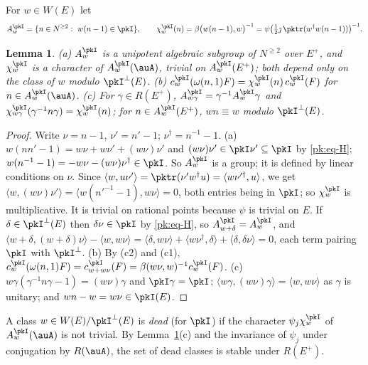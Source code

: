 \documentclass[10pt]{amsart}
\newtheorem{lemma}[theorem]{Lemma}
\theoremstyle{definition}
\theoremstyle{remark}
\begin{document}
For $w\in W(E)$ let
\[
A^{\pkI}_w=\{n\in N^{\ge2}:\ w(n-1)\in\pkI\},\qquad\chi^{\pkI}_w(n)=\beta\bigl(w(n-1),w\bigr)^{-1}=
\psi\bigl(\tfrac12\jmath\,\pktr(w^\dagger w(n-1))\bigr)^{-1}.
\]

\begin{lemma}\label{pk:char}
{\rm(a)} $A^{\pkI}_w$ is a unipotent algebraic subgroup of $N^{\ge2}$ over $E^+$, and
$\chi^{\pkI}_w$ is a character of $A^{\pkI}_w(\auA)$, trivial on $A^{\pkI}_w(E^+)$; both depend
only on the class of $w$ modulo $\pkI^\perp(E)$. {\rm(b)} $c^{\pkI}_w(\omega(n,1)F)=
\chi^{\pkI}_w(n)\,c^{\pkI}_w(F)$ for $n\in A^{\pkI}_w(\auA)$. {\rm(c)} For $\gamma\in R(E^+)$,
$A^{\pkI}_{w\gamma}=\gamma^{-1}A^{\pkI}_w\gamma$ and $\chi^{\pkI}_{w\gamma}(\gamma^{-1}n\gamma)=
\chi^{\pkI}_w(n)$; for $n\in A^{\pkI}_w(E^+)$, $wn\equiv w$ modulo $\pkI^\perp(E)$.
\end{lemma}
\begin{proof}
Write $\nu=n-1$, $\nu'=n'-1$; $\nu^\dagger=n^{-1}-1$. (a) $w(nn'-1)=w\nu+w\nu'+(w\nu)\nu'$ and
$(w\nu)\nu'\in\pkI\nu'\subseteq\pkI$ by \eqref{pk:eq-H}; $w(n^{-1}-1)=-w\nu-(w\nu)\nu^\dagger\in
\pkI$. So $A^{\pkI}_w$ is a group; it is defined by linear conditions on $\nu$. Since
$\langle w,u\nu'\rangle=\pktr(\nu'w^\dagger u)=\langle w\nu'^\dagger,u\rangle$, we get $\langle w,
(w\nu)\nu'\rangle=\langle w(n'^{-1}-1),w\nu\rangle=0$, both entries being in $\pkI$; so
$\chi^{\pkI}_w$ is multiplicative. It is trivial on rational points because $\psi$ is trivial on
$E$. If $\delta\in\pkI^\perp(E)$ then $\delta\nu\in\pkI$ by \eqref{pk:eq-H}, so
$A^{\pkI}_{w+\delta}=A^{\pkI}_w$, and $\langle w+\delta,(w+\delta)\nu\rangle-\langle w,w\nu\rangle=
\langle\delta,w\nu\rangle+\langle w\nu^\dagger,\delta\rangle+\langle\delta,\delta\nu\rangle=0$, each
term pairing $\pkI$ with $\pkI^\perp$. (b) By (c2) and (c1), $c^{\pkI}_w(\omega(n,1)F)=
c^{\pkI}_{w+w\nu}(F)=\beta(w\nu,w)^{-1}c^{\pkI}_w(F)$. (c) $w\gamma(\gamma^{-1}n\gamma-1)=(w\nu)
\gamma$ and $\pkI\gamma=\pkI$; $\langle w\gamma,(w\nu)\gamma\rangle=\langle w,w\nu\rangle$ as
$\gamma$ is unitary; and $wn-w=w\nu\in\pkI(E)$.
\end{proof}

A class $w\in W(E)/\pkI^\perp(E)$ is \emph{dead} (for $\pkI$) if the character
$\psi_j\chi^{\pkI}_w$ of $A^{\pkI}_w(\auA)$ is not trivial. By Lemma~\ref{pk:char}(c) and the
invariance of $\psi_j$ under conjugation by $R(\auA)$, the set of dead classes is stable under
$R(E^+)$.
\end{document}
